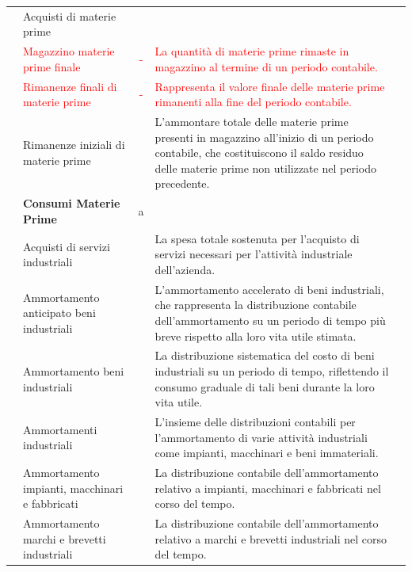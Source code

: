 \documentclass{article}
\newcommand{\RimanenzeFinaliMateriePrime}{Rappresenta il valore finale delle materie prime rimanenti alla fine del periodo contabile.}
\newcommand{\MagazzinoMateriePrimeFinale}{La quantità di materie prime rimaste in magazzino al termine di un periodo contabile.}
\newcommand{\RimanenzeInizialiMateriePrime}{L'ammontare totale delle materie prime presenti in magazzino all'inizio di un periodo contabile, che costituiscono il saldo residuo delle materie prime non utilizzate nel periodo precedente.}
\newcommand{\AcquistiServiziIndustriali}{La spesa totale sostenuta per l'acquisto di servizi necessari per l'attività industriale dell'azienda.}
\newcommand{\AmmortamentoAnticipatoBeniIndustriali}{L'ammortamento accelerato di beni industriali, che rappresenta la distribuzione contabile dell'ammortamento su un periodo di tempo più breve rispetto alla loro vita utile stimata.}
\newcommand{\AmmortamentoBeniIndustriali}{La distribuzione sistematica del costo di beni industriali su un periodo di tempo, riflettendo il consumo graduale di tali beni durante la loro vita utile.}
\newcommand{\AmmortamentiIndustriali}{L'insieme delle distribuzioni contabili per l'ammortamento di varie attività industriali come impianti, macchinari e beni immateriali.}
\newcommand{\AmmortamentoImpiantiMacchinariFabbricati}{La distribuzione contabile dell'ammortamento relativo a impianti, macchinari e fabbricati nel corso del tempo.}
\newcommand{\AmmortamentoMarchiBrevettiIndustriali}{La distribuzione contabile dell'ammortamento relativo a marchi e brevetti industriali nel corso del tempo.}
\begin{document}
\begin{table}[ht]
{\begin{tabular}{|c l|c|l|c|}
                           & Acquisti di materie prime                                               &                    &                                                             &           \\
                           & \textcolor{red}{Magazzino materie prime finale}                         & \textcolor{red}{-} & \textcolor{red}{\MagazzinoMateriePrimeFinale}               &           \\
                           & \textcolor{red}{Rimanenze finali di materie prime}                      & \textcolor{red}{-} & \textcolor{red}{\RimanenzeFinaliMateriePrime}               &           \\
                           & Rimanenze iniziali di materie prime                                     &                    & \RimanenzeInizialiMateriePrime                              &           \\
                           & \textbf{Consumi Materie Prime}                                          & a                  &                                                             &           \\
                           & Acquisti di servizi industriali                                         &                    & \AcquistiServiziIndustriali                                 &           \\
                           & Ammortamento anticipato beni industriali                                &                    & \AmmortamentoAnticipatoBeniIndustriali                      &           \\
                           & Ammortamento beni industriali                                           &                    & \AmmortamentoBeniIndustriali                                &           \\
                           & Ammortamenti industriali                                                &                    & \AmmortamentiIndustriali                                    &           \\
                           & Ammortamento impianti, macchinari e fabbricati                          &                    & \AmmortamentoImpiantiMacchinariFabbricati                   &           \\
                           & Ammortamento marchi e brevetti industriali                              &                    & \AmmortamentoMarchiBrevettiIndustriali                      &           \\

\end{tabular}}
\end{table}
\end{document}
